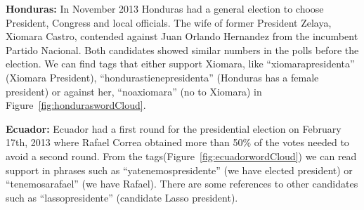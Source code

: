 \noindent
{\bf Honduras:}
In November 2013 Honduras had a general election to choose President, Congress and local officials. 
The wife of former President Zelaya, Xiomara Castro, contended against Juan Orlando Hernandez from the incumbent Partido Nacional. 
Both candidates showed similar numbers in the polls before the election. 
We can find tags that either support Xiomara, like “xiomarapresidenta” (Xiomara President), “hondurastienepresidenta” (Honduras has a female president) or against her, “noaxiomara” (no to Xiomara) in Figure~\ref{fig:honduraswordCloud}.

\noindent
{\bf Ecuador:}
Ecuador had a first round for the presidential election on February 17th, 2013 where Rafael Correa obtained more than 50\% of the votes needed to avoid a second round. 
From the tags(Figure~\ref{fig:ecuadorwordCloud}) we can read support in phrases such as “yatenemospresidente” (we have elected president) or “tenemosarafael” (we have Rafael). 
There are some references to other candidates such as “lassopresidente” (candidate Lasso president).

